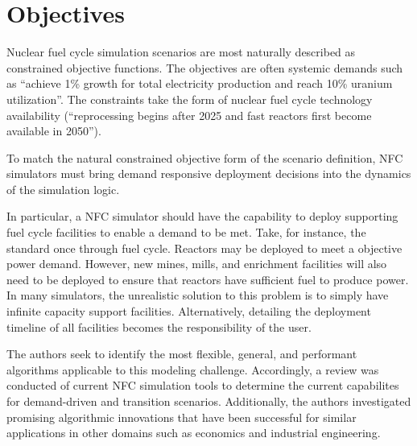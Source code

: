 \section{Objectives}
Nuclear fuel cycle simulation scenarios are most naturally described as 
constrained objective functions. The objectives are often systemic 
demands such as ``achieve 1\% growth for total electricity production 
and reach 10\% uranium utilization''. The constraints take 
the form of nuclear fuel cycle technology availability 
(``reprocessing begins after 2025 and fast reactors first become 
available in 2050'').

To match the natural constrained objective form of the scenario 
definition, \gls{NFC} simulators must bring demand responsive 
deployment decisions into the dynamics of the simulation logic.

In particular, a \gls{NFC} simulator should have the 
capability to deploy supporting fuel cycle facilities to enable 
a demand to be met. Take, for instance, the standard once through fuel 
cycle. Reactors may be deployed to meet a objective power demand. 
However, new mines, mills, and enrichment facilities will also need to be 
deployed to ensure that reactors have sufficient fuel to produce power.  
In many simulators, the unrealistic solution to this problem is to 
simply have infinite capacity support facilities. Alternatively, 
detailing the deployment timeline of all facilities becomes the 
responsibility of the user.

The authors seek to identify the most flexible, general, and performant 
algorithms applicable to this modeling challenge.  Accordingly, a review was 
conducted of current \gls{NFC} simulation tools to determine the 
current capabilites for demand-driven and transition scenarios. 
Additionally, the authors investigated promising algorithmic
innovations that have been successful for similar applications in other domains
such as economics and industrial engineering.
